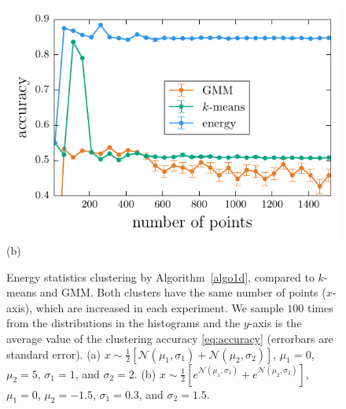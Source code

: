 \documentclass[aps,preprint,nofootinbib,floatfix]{revtex4-1}
\begin{document}
\begin{figure}
\begin{minipage}{0.49\textwidth}
\includegraphics[width=\textwidth]{loggauss1d.pdf}\\[-1em]
(b)
\end{minipage}
\caption{
\label{fig:1d}
Energy statistics clustering by Algorithm~\ref{algo1d},
compared to $k$-means and GMM.
Both clusters
have the same number of points ($x$-axis), 
which are increased in each experiment.
We sample $100$ times from the distributions in the histograms and
the $y$-axis is the average value of the clustering 
accuracy \eqref{eq:accuracy} (errorbars are standard error).
(a) 
$x\sim \tfrac{1}{2}\left[ \mathcal{N}(\mu_1,\sigma_1) +
\mathcal{N}(\mu_2,\sigma_2)  \right]$,  
$\mu_1 = 0$,
$\mu_2 = 5$,
$\sigma_1 = 1$, and
$\sigma_2 = 2$.
(b) 
$x\sim \tfrac{1}{2}\left[ e^{\mathcal{N}(\mu_1,\sigma_1)} +
e^{\mathcal{N}(\mu_2,\sigma_2)}  \right]$,  
$\mu_1 = 0$,
$\mu_2 = -1.5$,
$\sigma_1 = 0.3$, and
$\sigma_2 = 1.5$. 
}
\end{figure}
\end{document}
